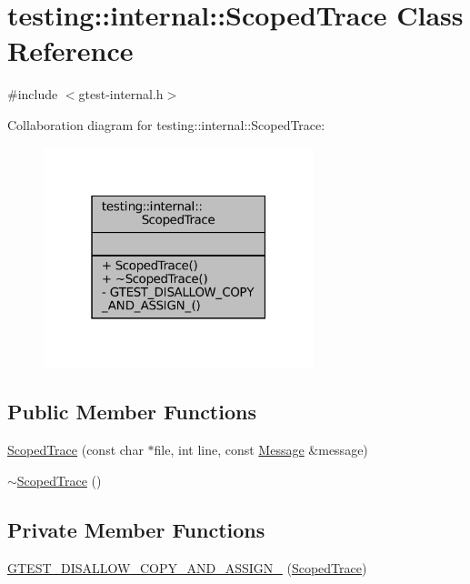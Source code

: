 \hypertarget{classtesting_1_1internal_1_1ScopedTrace}{}\section{testing\+:\+:internal\+:\+:Scoped\+Trace Class Reference}
\label{classtesting_1_1internal_1_1ScopedTrace}


{\ttfamily \#include $<$gtest-\/internal.\+h$>$}



Collaboration diagram for testing\+:\+:internal\+:\+:Scoped\+Trace\+:
\nopagebreak
\begin{figure}[H]
\begin{center}
\leavevmode
\includegraphics[width=223pt]{classtesting_1_1internal_1_1ScopedTrace__coll__graph}
\end{center}
\end{figure}
\subsection*{Public Member Functions}
\begin{DoxyCompactItemize}
\item 
\hyperlink{classtesting_1_1internal_1_1ScopedTrace_ab965d7010bbbc82c1bef6ebf8748bede}{Scoped\+Trace} (const char $\ast$file, int line, const \hyperlink{classtesting_1_1Message}{Message} \&message)
\item 
\hyperlink{classtesting_1_1internal_1_1ScopedTrace_a658c7c098ff48337058bfa2ccab65881}{$\sim$\+Scoped\+Trace} ()
\end{DoxyCompactItemize}
\subsection*{Private Member Functions}
\begin{DoxyCompactItemize}
\item 
\hyperlink{classtesting_1_1internal_1_1ScopedTrace_a0c896625ebd31d5cf7a2e7038df1c2b5}{G\+T\+E\+S\+T\+\_\+\+D\+I\+S\+A\+L\+L\+O\+W\+\_\+\+C\+O\+P\+Y\+\_\+\+A\+N\+D\+\_\+\+A\+S\+S\+I\+G\+N\+\_\+} (\hyperlink{classtesting_1_1internal_1_1ScopedTrace}{Scoped\+Trace})
\end{DoxyCompactItemize}


